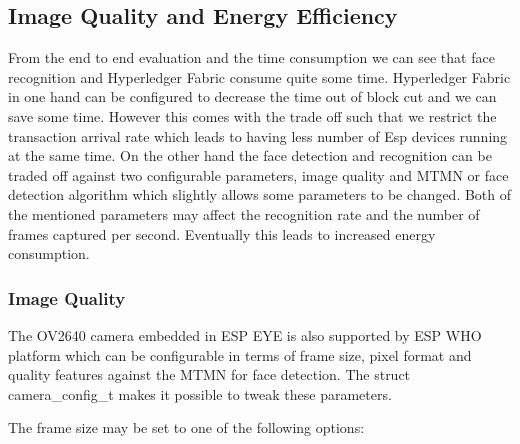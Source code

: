 

\subsection{Image Quality and Energy Efficiency}

From the end to end evaluation and the time consumption we can see that face recognition and Hyperledger Fabric consume quite some time. Hyperledger Fabric in one hand can be configured to decrease the time out of block cut and we can save some time. However this comes with the trade off such that we restrict the transaction arrival rate which leads to having less number of Esp devices running at the same time. 
On the other hand the face detection and recognition can be traded off against two configurable parameters, image quality and MTMN or face detection algorithm which slightly allows some parameters to be changed. Both of the mentioned parameters may affect the recognition rate and the number of frames captured per second. Eventually this leads to increased energy consumption. 

\subsubsection{Image Quality}

The OV2640 camera embedded in ESP EYE is also supported by ESP WHO platform which can be configurable in terms of frame size, pixel format and quality features against the MTMN for face detection. The struct {\selectfont camera\_config\_t} makes it possible to tweak these parameters. 

The frame size may be set to one of the following options:

